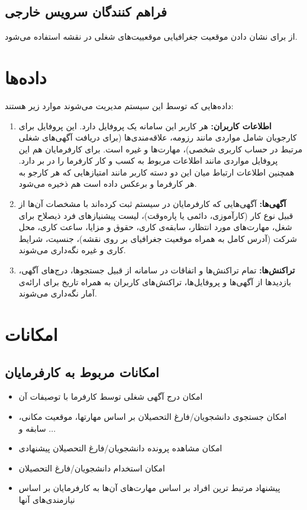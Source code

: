 \subsection{فراهم کنندگان سرویس خارجی}
از 
برای نشان دادن موقعیت جغرافیایی موقعییت‌های شغلی در نقشه استفاده می‌شود.

\section{داده‌ها}
داده‌هایی که توسط این سیستم مدیریت می‌شوند موارد زیر هستند:
\begin{enumerate}
\item \textbf{اطلاعات کاربران:}
هر کاربر این سامانه یک پروفایل دارد. این پروفایل برای کارجویان شامل مواردی مانند رزومه، علاقه‌مندی‌ها (برای دریافت آگهی‌های شغلی مرتبط در حساب کاربری شخصی)، مهارت‌ها و غیره است. برای کارفرمایان هم این پروفایل مواردی مانند اطلاعات مربوط به کسب و کار کارفرما را در بر دارد. همچنین اطلاعات ارتباط میان این دو دسته کاربر مانند امتیازهایی که هر کارجو به  هر کارفرما و برعکس داده است هم ذخیره می‌شود.

\item \textbf{آگهی‌ها:}
آگهی‌هایی که کارفرمایان در سیستم ثبت کرده‌اند با مشخصات آن‌ها از قبیل نوع کار (کارآموزی، دائمی یا پاره‌وقت)، لیست پیشنیازهای فرد ذیصلاح برای شغل، مهارت‌های مورد انتظار، سابقه‌ی ‌کاری، حقوق و مزایا، ساعت کاری، محل شرکت (آدرس کامل به همراه موقعیت جغرافیای بر روی نقشه)، جنسیت، شرایط کاری و غیره نگه‌داری می‌شوند.
\item \textbf{تراکنش‌ها:}
تمام تراکنش‌ها و اتفاقات در سامانه از قبیل جستجوها، درج‌های آگهی، بازدید‌ها از آگهی‌ها و پروفایل‌ها، تراکنش‌های کاربران به همراه تاریخ برای ارائه‌ی آمار نگه‌داری می‌شوند.
\end{enumerate}

\section{امکانات}
\subsection{
امکانات مربوط به کارفرمایان}
\begin{itemize}
	\item
	امکان درج آگهی شغلی توسط کارفرما با توصیفات آن
	\item
	امکان جستجوی دانشجویان/فارغ التحصیلان بر اساس مهارتها، موقعیت مکانی، سابقه و ... 
	\item
	امکان مشاهده پرونده دانشجویان/فارغ التحصیلان پیشنهادی
	\item
	امکان استخدام دانشجویان/فارغ التحصیلان
	 \item
	پیشنهاد مرتبط‌‌‌ ‌ترین افراد بر اساس مهارت‌های آن‌ها به کارفرمایان بر اساس نیازمندی‌های آنها
\end{itemize}
